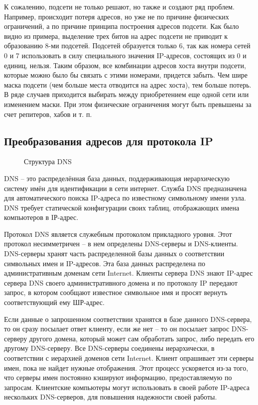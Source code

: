 \documentclass[a4paper]{article}
\begin{document}
	К сожалению, подсети не только решают, но также и создают ряд проблем. Например, происходит потеря адресов, но уже не по причине физических ограничений, а по причине принципа построения адресов подсети. Как было видно из примера, выделение трех битов на адрес подсети не приводит к образованию 8-ми подсетей. Подсетей образуется только 6, так как номера сетей 0 и 7 использовать в силу специального значения IP-адресов, состоящих из 0 и единиц, нельзя. Таким образом, все комбинации адресов хоста внутри подсети, которые можно было бы связать с этими номерами, придется забыть. Чем шире маска подсети (чем больше места отводится на адрес хоста), тем больше потерь. В ряде случаев приходится выбирать между приобретением еще одной сети или изменением маски. При этом физические ограничения могут быть превышены за счет репитеров, хабов и т. п.	
	
	\subsection{Преобразования адресов для протокола IP}
\begin{figure}[h]
    \centering
    \resizebox{.5\linewidth}{!}{}
    \caption{Структура DNS}
\end{figure}

	DNS -- это распределённая база данных, поддерживающая иерархическую систему имён для идентификации в сети интернет. Служба DNS предназначена для автоматического поиска IP-адреса по известному символьному имени узла. DNS требует статической конфигурации своих таблиц, отображающих имена компьютеров в IР-адрес.
	
	Протокол DNS является служебным протоколом прикладного уровня. Этот протокол несимметричен -- в нем определены DNS-серверы и DNS-клиенты. DNS-серверы хранят часть распределенной базы данных о соответствии символьных имен и IP-адресов. Эта база данных распределена по административным доменам сети Internet. Клиенты сервера DNS знают IP-адрес сервера DNS своего административного домена и по протоколу IP передают запрос, в котором сообщают известное символьное имя и просят вернуть соответствующий ему ШР-адрес.
	
	Если данные о запрошенном соответствии хранятся в базе данного DNS-сервера, то он сразу посылает ответ клиенту, если же нет -- то он посылает запрос DNS-серверу другого домена, который может сам обработать запрос, либо передать его другому DNS-серверу. Все DNS-серверы соединены иерархически, в соответствии с иерархией доменов сети Internet. Клиент опрашивает эти серверы имен, пока не найдет нужные отображения. Этот процесс ускоряется из-за того, что серверы имен постоянно кэшируют информацию, предоставляемую по запросам. Клиентские компьютеры могут использовать в своей работе IP-адреса нескольких DNS-серверов, для повышения надежности своей работы.
	
\end{document}
